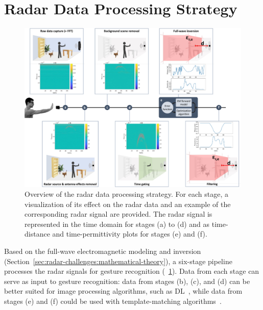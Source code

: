 \section{Radar Data Processing Strategy} \label{sec:radar-challenges:processing-strategy}

\begin{figure}[t]
\centering
\includegraphics[width=\linewidth,trim={0 0 0.3cm 0},clip]{Figures/RadarChallenges/Pipeline/pipeline-detailed.pdf}
\caption{Overview of the radar data processing strategy. For each stage, a visualization of its effect on the radar data and an example of the corresponding radar signal are provided. The radar signal is represented in the time domain for stages (a) to (d) and as time-distance and time-permittivity plots for stages (e) and (f).}
\label{fig:radar-challenges:pipeline}
\vspace{-12pt}
\end{figure}

Based on the full-wave electromagnetic modeling and inversion (Section~\ref{sec:radar-challenges:mathematical-theory}), a six-stage pipeline processes the radar signals for gesture recognition (\fig~\ref{fig:radar-challenges:pipeline}). Data from each stage can serve as input to gesture recognition: data from stages (b), (c), and (d) can be better suited for image processing algorithms, such as DL~\cite{Skaria:2019}, while data from stages (e) and (f) could be used with template-matching algorithms~\cite{Ousmer:2020}.

